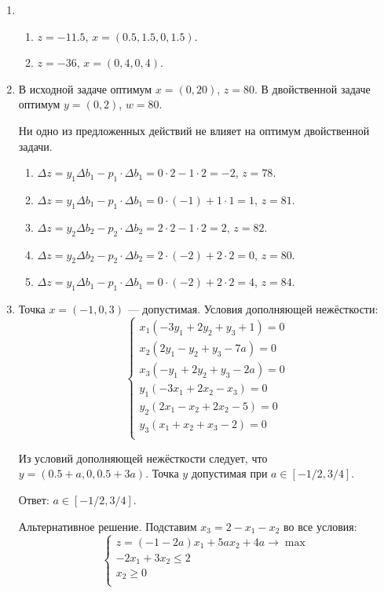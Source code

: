 \documentclass[12pt]{article}
\begin{document}
\begin{enumerate}
\item %

\begin{enumerate}
  \item $z = -11.5$, $x = (0.5, 1.5, 0, 1.5)$.
  \item $z = -36$, $x = (0, 4, 0, 4)$.
\end{enumerate} 

\item %
В исходной задаче оптимум $x = (0, 20)$, $z=80$.
В двойственной задаче оптимум $ y = (0, 2)$, $w = 80$.

Ни одно из предложенных действий не влияет на оптимум двойственной задачи. 
\begin{enumerate}
  \item $\Delta z = y_1 \Delta b_1 - p_1 \cdot \Delta b_1 = 0 \cdot 2 - 1 \cdot 2 = -2$, $z= 78$.
  \item $\Delta z = y_1 \Delta b_1 - p_1 \cdot \Delta b_1 = 0 \cdot (-1) + 1 \cdot 1 = 1$, $z = 81$.
  \item $\Delta z = y_2 \Delta b_2 - p_2 \cdot \Delta b_2 = 2 \cdot 2 - 1 \cdot 2 = 2$, $z = 82$.
  \item $\Delta z = y_2 \Delta b_2 - p_2 \cdot \Delta b_2 = 2 \cdot (-2) + 2 \cdot 2 = 0$, $z = 80$.
  \item $\Delta z = y_1 \Delta b_1 - p_1 \cdot \Delta b_1 = 0 \cdot (-2) + 2 \cdot 2 = 4$, $z = 84$.
\end{enumerate}

\item %
Точка $x = (-1, 0, 3)$ — допустимая. 
Условия дополняющей нежёсткости:
\[
\begin{cases}
  x_1 (-3y_1 + 2y_2 +y_3 + 1) = 0 \\
  x_2 (2y_1 - y_2 + y_3 - 7a) = 0 \\
  x_3 (-y_1 +2 y_2 +y_3 - 2a) = 0 \\ 
  y_1 (-3x_1 + 2 x_2 - x_3) = 0 \\
  y_2 (2x_1 - x_2 + 2x_2 - 5) = 0 \\
  y_3 (x_1 + x_2 + x_3 - 2) = 0 \\ 
\end{cases}  
\]

Из условий дополняющей нежёсткости следует, что $y = (0.5 + a, 0, 0.5 + 3a)$.
Точка $y$ допустимая при $a \in [-1/2, 3/4]$.

Ответ: $a \in [-1/2, 3/4]$.

Альтернативное решение. 
Подставим $x_3 = 2 - x_1 - x_2$ во все условия:
\[
\begin{cases}
  z = (-1 - 2a)x_1 + 5a x_2 +4 a \to \max \\
  -2 x_1 + 3x_2 \leq 2 \\
  x_2 \geq 0 \\
\end{cases}
\]


\end{enumerate}
\end{document}
